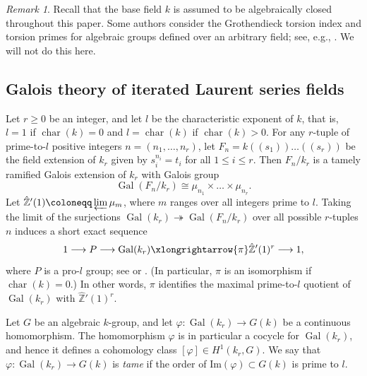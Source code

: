 \documentclass[12pt]{amsart}
\numberwithin{equation}{section}
\theoremstyle{remark}
\newtheorem{remark}[theorem]{Remark}
\newcommand{\vphi}{\varphi}
\newcommand{\Gal}{\operatorname{Gal}}
\newcommand{\Char}{\operatorname{char}}
\newcommand{\bZ}{\mathbb{Z}}
\begin{document}
\begin{remark} Recall that the base field $k$ is assumed to be algebraically closed throughout this paper. Some authors consider the Grothendieck torsion index and torsion primes for algebraic groups defined over an arbitrary field;
see, e.g., \cite{tits1992, serre-pp}. We will not do this here.
\end{remark}

\subsection{Galois theory of iterated Laurent series fields}
\label{sect.galois-laurent}
Let $r\geqslant 0$ be an integer, and let $l$ be the characteristic exponent of $k$, that is, $l = 1$ if $\Char(k) = 0$ and $l = \Char(k)$ if $\Char(k) > 0$.
For any $r$-tuple of prime-to-$l$ positive integers $n = (n_1,\dots,n_r)$, let $F_n = k(\!(s_1)\!)\dots(\!(s_r)\!)$ be the field extension of $k_r$ given by $s_i^{n_i} = t_i$ for all $1\leq i\leq r$. Then $F_n/k_r$ is a tamely ramified Galois extension of $k_r$ with Galois group $$\Gal(F_n/k_r)\cong \mu_{n_1}\times \dots \times \mu_{n_r}.$$
Let $\hat{\bZ}'(1)\coloneqq \varprojlim \mu_m$, where $m$ ranges over all integers prime to $l$. Taking the limit of the surjections $\Gal(k_r) \twoheadrightarrow \Gal(F_n/k_r)$ over all possible $r$-tuples $n$ induces a short exact sequence
\begin{equation}\label{eq:gal-kr-presentation}
    1 \longrightarrow P \longrightarrow \Gal(k_r) \xlongrightarrow{\pi} \hat{\bZ}'(1)^r \longrightarrow 1,
\end{equation}
where $P$ is a pro-$l$ group; see \cite[Theorem A.24]{tignol2015value} or \cite[Lemma 5.1]{gille2009lower}. (In particular, $\pi$ is an isomorphism if $\Char(k)=0$.) In other words, $\pi$ identifies the maximal prime-to-$l$ quotient of $\Gal(k_r)$ with $\hat{\bZ}'(1)^r$.

Let $G$ be an algebraic $k$-group, and let $\vphi\colon \Gal(k_r)\to G(k)$ be a continuous homomorphism. The homomorphism $\vphi$ is in particular a cocycle for $\Gal(k_r)$, and hence it defines a cohomology class $[\vphi]\in H^1(k_r,G)$. We say that $\vphi\colon \Gal(k_r)\to G(k)$ is \emph{tame} if the order of $\mathrm{Im}(\vphi)\subset G(k)$ is prime to $l$.
\end{document}
